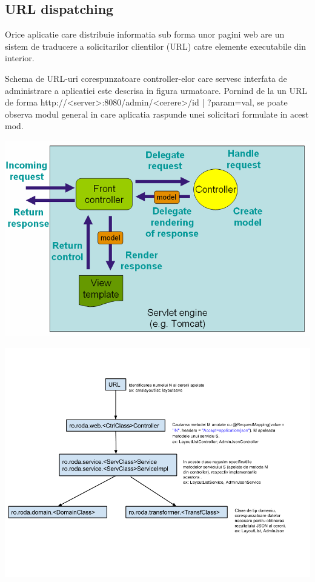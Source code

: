 \subsection{URL dispatching}
\label{url_dispatching}

Orice aplicatie care distribuie informatia sub forma unor pagini web are un sistem de traducere a solicitarilor clientilor (URL) catre elemente executabile din interior. 

Schema de URL-uri corespunzatoare controller-elor care servesc interfata de administrare a aplicatiei este descrisa in figura urmatoare. 
Pornind de la un URL de forma http://<server>:8080/admin/<cerere>{/{id} | ?param=val}, se poate observa modul general in care aplicatia raspunde unei solicitari formulate in acest mod.

\bigskip

\begin{center}
\includegraphics[width=\textwidth]{mvc.png}
\end{center}

\bigskip

\begin{center}
\includegraphics[width=\textwidth]{roda_URL.png}
\end{center}

\bigskip

